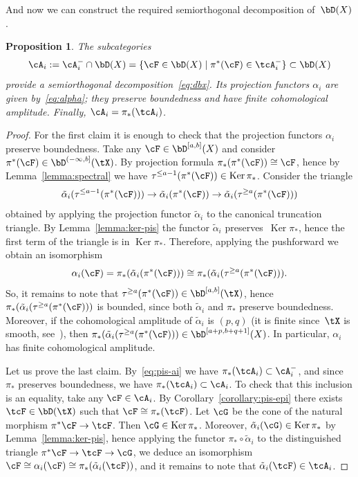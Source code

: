 \documentclass[11pt]{amsart}
\DeclareMathOperator{\Ker}{\mathrm{Ker}}
\theoremstyle{plain}
\newtheorem{proposition}[theorem]{Proposition}
\theoremstyle{definition}
\theoremstyle{remark}
\begin{document}
And now we can construct the required semiorthogonal decomposition of~$\bD(X)$.

\begin{proposition}
\label{proposition:sod-dbx}
The subcategories 
\begin{equation*}
\cA_i := \cA_i^- \cap \bD(X) = \{ \cF \in \bD(X) \mid \pi^*(\cF) \in \tcA_i^- \} \subset \bD(X)
\end{equation*}
provide a semiorthogonal decomposition~\eqref{eq:dbx}.
Its projection functors $\alpha_i$ are given by~\eqref{eq:alpha}; they preserve boundedness and have finite cohomological amplitude.
Finally, $\cA_i = \pi_*(\tcA_i)$.
\end{proposition}
\begin{proof}
For the first claim it is enough to check that the projection functors $\alpha_i$ preserve boundedness.
Take any $\cF \in \bD^{[a,b]}(X)$ and consider $\pi^*(\cF) \in \bD^{(-\infty,b]}(\tX)$.
By projection formula $\pi_*(\pi^*(\cF)) \cong \cF$, hence by Lemma~\ref{lemma:spectral} we have $\tau^{\le a-1}(\pi^*(\cF)) \in \Ker \pi_*$.
Consider the triangle
\begin{equation*}
\tilde\alpha_i(\tau^{\le a-1}(\pi^*(\cF))) \to \tilde\alpha_i(\pi^*(\cF)) \to \tilde\alpha_i(\tau^{\ge a}(\pi^*(\cF)))
\end{equation*}
obtained by applying the projection functor $\tilde\alpha_i$ to the canonical truncation triangle.
By Lemma~\ref{lemma:ker-pis} the functor $\tilde\alpha_i$ preserves~$\Ker\pi_*$, hence the first term of the triangle is in $\Ker \pi_*$.
Therefore, applying the pushforward we obtain an isomorphism 
\begin{equation*}
\alpha_i(\cF) = \pi_*(\tilde\alpha_i(\pi^*(\cF))) \cong \pi_*(\tilde\alpha_i(\tau^{\ge a}(\pi^*(\cF))).
\end{equation*}
So, it remains to note that $\tau^{\ge a}(\pi^*(\cF)) \in \bD^{[a,b]}(\tX)$,
hence $\pi_*(\tilde\alpha_i(\tau^{\ge a}(\pi^*(\cF)))$ is bounded, since both $\tilde\alpha_i$ and $\pi_*$ preserve boundedness.
Moreover, if the cohomological amplitude of $\tilde\alpha_i$ is $(p,q)$ 
(it is finite since~$\tX$ is smooth, see~\cite[Proposition~2.5]{kuznetsov2008resolution}), then
$\pi_*(\tilde\alpha_i(\tau^{\ge a}(\pi^*(\cF))) \in \bD^{[a+p,b+q+1]}(X)$.
In particular, $\alpha_i$ has finite cohomological amplitude.

Let us prove the last claim.
By~\eqref{eq:pis-ai} we have $\pi_*(\tcA_i) \subset \cA_i^-$, and since $\pi_*$ preserves boundedness, we have $\pi_*(\tcA_i) \subset \cA_i$.
To check that this inclusion is an equality, take any $\cF \in \cA_i$.
By Corollary~\ref{corollary:pis-epi} there exists $\tcF \in \bD(\tX)$ such that $\cF \cong \pi_*(\tcF)$.
Let $\cG$ be the cone of the natural morphism $\pi^*\cF \to \tcF$.
Then $\cG \in \Ker  \pi_*$.
Moreover, $\tilde\alpha_i(\cG) \in \Ker \pi_*$ by Lemma~\ref{lemma:ker-pis}, hence applying the functor $\pi_* \circ \tilde\alpha_i$ 
to the distinguished triangle $\pi^*\cF \to \tcF \to \cG$, we deduce an isomorphism $\cF \cong \alpha_i(\cF) \cong \pi_*(\tilde\alpha_i(\tcF))$,
and it remains to note that $\tilde\alpha_i(\tcF) \in \tcA_i$.
\end{proof}
\end{document}
